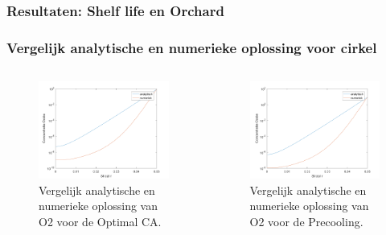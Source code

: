 \documentclass{beamer}
\begin{document}
\begin{frame}
\frametitle{Resultaten: Shelf life en Orchard}
\end{frame}

\begin{frame}
\frametitle{Vergelijk analytische en numerieke oplossing voor cirkel}
\begin{columns}
\begin{column}{0.48\textwidth}
\begin{figure}
\includegraphics[width = 1\textwidth]{Optimal_CA_sphere_O2_analytical.png}
\caption{Vergelijk analytische en numerieke oplossing van O2 voor de Optimal CA.}
\end{figure}
\end{column}
	
\begin{column}{0.48\textwidth}
\begin{figure}
\includegraphics[width = 1\textwidth]{Precooling_sphere_O2_analytical.png}
\caption{Vergelijk analytische en numerieke oplossing van O2 voor de Precooling.}
\end{figure}
\end{column}
\end{columns}
\end{frame}
\end{document}
